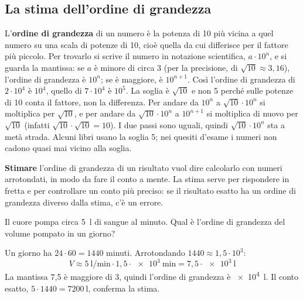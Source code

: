 

\subsection{La stima dell'ordine di grandezza}

L'\textbf{ordine di grandezza} di un numero è la potenza di 10 più vicina a quel numero su una scala di potenze di 10, cioè quella da cui differisce per il fattore più piccolo. Per trovarlo si scrive il numero in notazione scientifica, $a \cdot 10^{n}$, e si guarda la mantissa: se $a$ è minore di circa 3 (per la precisione, di $\sqrt{10} \approx 3{,}16$), l'ordine di grandezza è $10^{n}$; se è maggiore, è $10^{n+1}$. Così l'ordine di grandezza di $2 \cdot 10^{4}$ è $10^{4}$, quello di $7 \cdot 10^{4}$ è $10^{5}$. La soglia è $\sqrt{10}$ e non 5 perché sulle potenze di 10 conta il fattore, non la differenza. Per andare da $10^{n}$ a $\sqrt{10} \cdot 10^{n}$ si moltiplica per $\sqrt{10}$, e per andare da $\sqrt{10} \cdot 10^{n}$ a $10^{n+1}$ si moltiplica di nuovo per $\sqrt{10}$ (infatti $\sqrt{10} \cdot \sqrt{10} = 10$). I due passi sono uguali, quindi $\sqrt{10} \cdot 10^{n}$ sta a metà strada. Alcuni libri usano la soglia 5; nei quesiti d'esame i numeri non cadono quasi mai vicino alla soglia.

\textbf{Stimare} l'ordine di grandezza di un risultato vuol dire calcolarlo con numeri arrotondati, in modo da fare il conto a mente. La stima serve per rispondere in fretta e per controllare un conto più preciso: se il risultato esatto ha un ordine di grandezza diverso dalla stima, c'è un errore.

\begin{esempio}
Il cuore pompa circa \SI{5}{\litre} di sangue al minuto. Qual è l'ordine di grandezza del volume pompato in un giorno?

Un giorno ha $24 \cdot 60 = \num{1440}$ minuti. Arrotondando $1440 \approx 1{,}5 \cdot 10^{3}$:
\[
  V \approx \SI{5}{\litre\per\minute} \cdot 1{,}5 \cdot \SI{e3}{\minute} = 7{,}5 \cdot \SI{e3}{\litre}
\]
La mantissa 7,5 è maggiore di 3, quindi l'ordine di grandezza è \SI{e4}{\litre}. Il conto esatto, $5 \cdot 1440 = \SI{7200}{\litre}$, conferma la stima.
\end{esempio}

